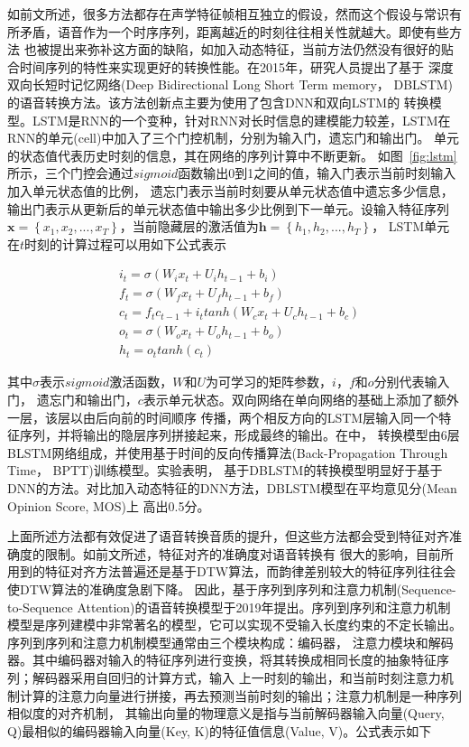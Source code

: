 如前文所述，很多方法都存在声学特征帧相互独立的假设，然而这个假设与常识有所矛盾，语音作为一个时序序列，距离越近的时刻往往相关性就越大。即使有些方法
也被提出来弥补这方面的缺陷，如加入动态特征，当前方法仍然没有很好的贴合时间序列的特性来实现更好的转换性能。在2015年，研究人员提出了基于
深度双向长短时记忆网络(Deep Bidirectional Long Short Term memory， DBLSTM)的语音转换方法\cite{sun2015voice}。该方法创新点主要为使用了包含DNN和双向LSTM的
转换模型。LSTM是RNN的一个变种，针对RNN对长时信息的建模能力较差，LSTM在RNN的单元(cell)中加入了三个门控机制，分别为输入门，遗忘门和输出门。
单元的状态值代表历史时刻的信息，其在网络的序列计算中不断更新。
如图~\ref{fig:lstm}所示，三个门控会通过$sigmoid$函数输出0到1之间的值，输入门表示当前时刻输入加入单元状态值的比例，
遗忘门表示当前时刻要从单元状态值中遗忘多少信息，输出门表示从更新后的单元状态值中输出多少比例到下一单元。设输入特征序列
$\mathbf{x}=\left\{x_1,x_2,...,x_T\right\}$，当前隐藏层的激活值为$\mathbf{h}=\left\{h_1,h_2,...,h_T\right\}$，
LSTM单元在$t$时刻的计算过程可以用如下公式表示

\begin{align}
    & i_t = \sigma (W_{i}x_t + U_ih_{t-1}+b_i) \\
    & f_t = \sigma (W_{f}x_t + U_fh_{t-1}+b_f) \\
    & c_t = f_tc_{t-1} + i_ttanh(W_cx_t+U_ch_{t-1}+b_c) \\
    & o_t = \sigma (W_{o}x_t + U_oh_{t-1}+b_o) \\
    & h_t = o_ttanh(c_t)
\end{align}
  
其中$\sigma$表示$sigmoid$激活函数，$W$和$U$为可学习的矩阵参数，$i$，$f$和$o$分别代表输入门，
遗忘门和输出门，$c$表示单元状态。双向网络在单向网络的基础上添加了额外一层，该层以由后向前的时间顺序
传播，两个相反方向的LSTM层输入同一个特征序列，并将输出的隐层序列拼接起来，形成最终的输出。在\cite{sun2015voice}中，
转换模型由6层BLSTM网络组成，并使用基于时间的反向传播算法(Back-Propagation Through Time， BPTT)训练模型。实验表明，
基于DBLSTM的转换模型明显好于基于DNN的方法。对比加入动态特征的DNN方法，DBLSTM模型在平均意见分(Mean Opinion Score, MOS)上
高出0.5分。

上面所述方法都有效促进了语音转换音质的提升，但这些方法都会受到特征对齐准确度的限制。如前文所述，特征对齐的准确度对语音转换有
很大的影响，目前所用到的特征对齐方法普遍还是基于DTW算法，而韵律差别较大的特征序列往往会使DTW算法的准确度急剧下降。
因此，基于序列到序列和注意力机制(Sequence-to-Sequence Attention)的语音转换模型于2019年提出\cite{tanaka2019atts2s}。序列到序列和注意力机制
模型是序列建模中非常著名的模型，它可以实现不受输入长度约束的不定长输出。序列到序列和注意力机制模型通常由三个模块构成：编码器，
注意力模块和解码器。其中编码器对输入的特征序列进行变换，将其转换成相同长度的抽象特征序列；解码器采用自回归的计算方式，输入
上一时刻的输出，和当前时刻注意力机制计算的注意力向量进行拼接，再去预测当前时刻的输出；注意力机制是一种序列相似度的对齐机制，
其输出向量的物理意义是指与当前解码器输入向量(Query, Q)最相似的编码器输入向量(Key, K)的特征值信息(Value, V)。公式表示如下

